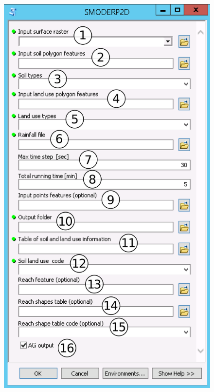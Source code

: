   
  \begin{figure}[t!]
    \centering
    \begin{minipage}[t]{.45\textwidth}
      \centering
      \vspace{0pt}
      \includegraphics[width=\textwidth]{./img/toolboxpopis4.png}
    \end{minipage}\hfill
    \begin{minipage}[t]{.55\textwidth}

\end{minipage}
\end{figure}
